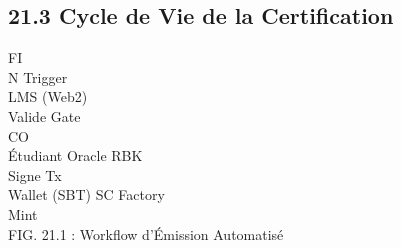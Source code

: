 \subsection{21.3 Cycle de Vie de la Certification}
\vspace{0.5em}
\vspace{0.5em}
\vspace{0.5em}
FI\\
N Trigger\\
LMS (Web2)\\
Valide Gate\\
CO\\
Étudiant                                           Oracle RBK\\
\vspace{0.5em}
\vspace{0.5em}
Signe Tx\\
\vspace{0.5em}
\vspace{0.5em}
Wallet (SBT)              SC Factory\\
Mint\\
\vspace{0.5em}
FIG. 21.1 : Workflow d’Émission Automatisé\\
\vspace{0.5em}
\vspace{0.5em}
